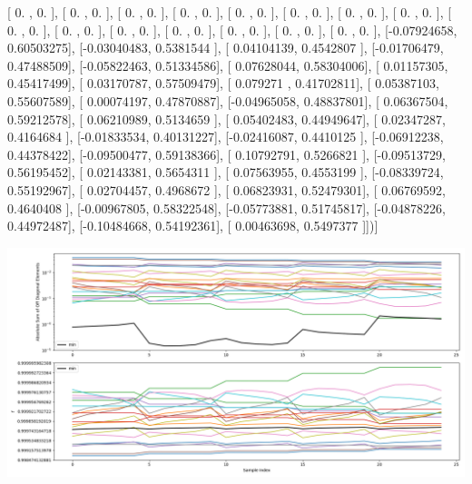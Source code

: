 \documentclass{article}
\begin{document}
       [ 0.        ,  0.        ],
       [ 0.        ,  0.        ],
       [ 0.        ,  0.        ],
       [ 0.        ,  0.        ],
       [ 0.        ,  0.        ],
       [ 0.        ,  0.        ],
       [ 0.        ,  0.        ],
       [ 0.        ,  0.        ],
       [ 0.        ,  0.        ],
       [ 0.        ,  0.        ],
       [ 0.        ,  0.        ],
       [ 0.        ,  0.        ],
       [ 0.        ,  0.        ],
       [ 0.        ,  0.        ],
       [ 0.        ,  0.        ],
       [-0.07924658,  0.60503275],
       [-0.03040483,  0.5381544 ],
       [ 0.04104139,  0.4542807 ],
       [-0.01706479,  0.47488509],
       [-0.05822463,  0.51334586],
       [ 0.07628044,  0.58304006],
       [ 0.01157305,  0.45417499],
       [ 0.03170787,  0.57509479],
       [ 0.079271  ,  0.41702811],
       [ 0.05387103,  0.55607589],
       [ 0.00074197,  0.47870887],
       [-0.04965058,  0.48837801],
       [ 0.06367504,  0.59212578],
       [ 0.06210989,  0.5134659 ],
       [ 0.05402483,  0.44949647],
       [ 0.02347287,  0.4164684 ],
       [-0.01833534,  0.40131227],
       [-0.02416087,  0.4410125 ],
       [-0.06912238,  0.44378422],
       [-0.09500477,  0.59138366],
       [ 0.10792791,  0.5266821 ],
       [-0.09513729,  0.56195452],
       [ 0.02143381,  0.5654311 ],
       [ 0.07563955,  0.4553199 ],
       [-0.08339724,  0.55192967],
       [ 0.02704457,  0.4968672 ],
       [ 0.06823931,  0.52479301],
       [ 0.06769592,  0.4640408 ],
       [-0.00967805,  0.58322548],
       [-0.05773881,  0.51745817],
       [-0.04878226,  0.44972487],
       [-0.10484668,  0.54192361],
       [ 0.00463698,  0.5497377 ]])]
\begin{center}
\includegraphics[scale=.9]{report_pickled_controls218/control_dpn_all.png}

\end{center}
\end{document}
